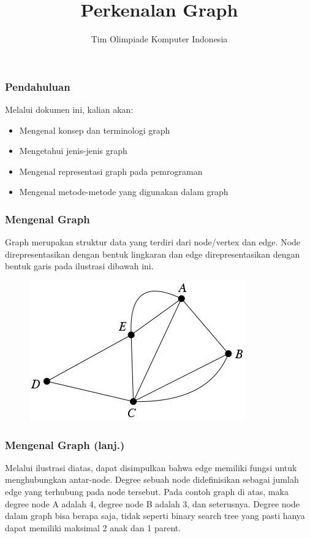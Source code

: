 

\title{Perkenalan Graph}
\author{Tim Olimpiade Komputer Indonesia}
\date{}




\begin{frame}
\titlepage
\end{frame}

\begin{frame}
\frametitle{Pendahuluan}
Melalui dokumen ini, kalian akan:
\begin{itemize}
  \item Mengenal konsep dan terminologi graph
  \item Mengetahui jenis-jenis graph
  \item Mengenal representasi graph pada pemrograman
  \item Mengenal metode-metode yang digunakan dalam graph
\end{itemize}

\end{frame}

\begin{frame}
\frametitle{Mengenal Graph}
Graph merupakan struktur data yang terdiri dari \alert{node/vertex} dan \alert{edge}. Node direpresentasikan dengan bentuk lingkaran dan edge direpresentasikan dengan bentuk garis pada ilustrasi dibawah ini.

\begin{figure}
  \centering
  \includegraphics[width=6 cm]{asset/graph.jpg}
\end{figure}
\end{frame}

\begin{frame}
\frametitle{Mengenal Graph (lanj.)}
Melalui ilustrasi diatas, dapat disimpulkan bahwa edge memiliki fungsi untuk menghubungkan antar-node. \alert{Degree} sebuah node didefinisikan sebagai jumlah edge yang terhubung pada node tersebut.\newline\newline
Pada contoh graph di atas, maka degree node A adalah 4, degree node B adalah 3, dan seterusnya. Degree node dalam graph bisa berapa saja, tidak seperti binary search tree yang pasti hanya dapat memiliki maksimal 2 anak dan 1 parent. 
\end{frame}

